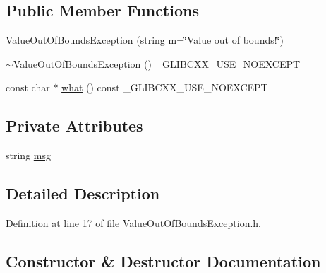 \subsection*{Public Member Functions}
\begin{DoxyCompactItemize}
\item 
\hyperlink{class_hardware_1_1_exception_1_1_value_out_of_bounds_exception_a1756ccdc56400b77e1f085df854738e4}{Value\+Out\+Of\+Bounds\+Exception} (string \hyperlink{_gen_blob_8m_ab3cd915d758008bd19d0f2428fbb354a}{m}=\char`\"{}Value out of bounds!\char`\"{})
\item 
\hyperlink{class_hardware_1_1_exception_1_1_value_out_of_bounds_exception_ac94abda1653cca6c85a936e46e0d0424}{$\sim$\+Value\+Out\+Of\+Bounds\+Exception} () \+\_\+\+G\+L\+I\+B\+C\+X\+X\+\_\+\+U\+S\+E\+\_\+\+N\+O\+E\+X\+C\+E\+P\+T
\item 
const char $\ast$ \hyperlink{class_hardware_1_1_exception_1_1_value_out_of_bounds_exception_a2c3892baec3ab92f686b31c5f15b59b2}{what} () const \+\_\+\+G\+L\+I\+B\+C\+X\+X\+\_\+\+U\+S\+E\+\_\+\+N\+O\+E\+X\+C\+E\+P\+T
\end{DoxyCompactItemize}
\subsection*{Private Attributes}
\begin{DoxyCompactItemize}
\item 
string \hyperlink{class_hardware_1_1_exception_1_1_value_out_of_bounds_exception_a9a118d00116fbc47c0eaa7e502a8ea68}{msg}
\end{DoxyCompactItemize}


\subsection{Detailed Description}


Definition at line 17 of file Value\+Out\+Of\+Bounds\+Exception.\+h.



\subsection{Constructor \& Destructor Documentation}
\hypertarget{class_hardware_1_1_exception_1_1_value_out_of_bounds_exception_a1756ccdc56400b77e1f085df854738e4}{}
